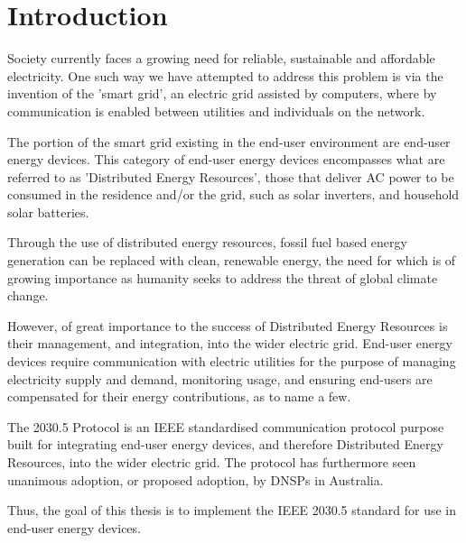 \chapter{Introduction}\label{ch:intro}
Society currently faces a growing need for reliable, sustainable and affordable electricity.
One such way we have attempted to address this problem is via the invention of the 'smart grid', an electric grid assisted by computers, where by communication is enabled between utilities and individuals on the network.

The portion of the smart grid existing in the end-user environment are end-user energy devices.
This category of end-user energy devices encompasses what are referred to as 'Distributed Energy Resources',
those that deliver AC power to be consumed in the residence and/or the grid, such as solar inverters, and household solar batteries. \cite{IEEE2030.5}

Through the use of distributed energy resources, fossil fuel based energy generation can be replaced with clean, 
renewable energy, the need for which is of growing importance as humanity seeks to address the threat of global climate change.

However, of great importance to the success of Distributed Energy Resources is their management, and integration, into the wider electric grid.
End-user energy devices require communication with electric utilities for the purpose of managing electricity supply and demand, monitoring usage, 
and ensuring end-users are compensated for their energy contributions, as to name a few.

The 2030.5 Protocol is an IEEE standardised communication protocol purpose built for integrating end-user energy devices, and therefore Distributed Energy Resources, into the wider electric grid.
The protocol has furthermore seen unanimous adoption, or proposed adoption, by DNSPs in Australia.\cite{DOEAdoption}

Thus, the goal of this thesis is to implement the IEEE 2030.5 standard for use in end-user energy devices.


